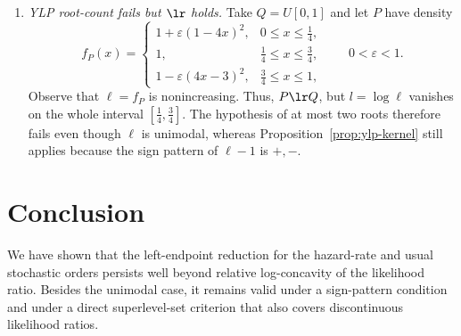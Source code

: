 \documentclass[11pt]{article}
\begin{document}
\begin{example}
\begin{enumerate}[label=\textup{(\Alph*)}]
\item \emph{YLP root-count fails but \(\lr\) holds.}
Take \(Q=U[0,1]\) and let \(P\) have density
\[
f_P(x)=
\begin{cases}
1+\varepsilon(1-4x)^2, & 0\le x\le \tfrac14,\\[1mm]
1, & \tfrac14\le x\le \tfrac34,\\[1mm]
1-\varepsilon(4x-3)^2, & \tfrac34\le x\le 1,
\end{cases}
\qquad 0<\varepsilon<1.
\]
Observe that \(\ell=f_P\) is nonincreasing. Thus, \(P\lr Q\), but \(l=\log\ell\) vanishes on the whole interval \([\tfrac14,\tfrac34]\). The hypothesis of  at most two roots therefore fails even though $\ell$ is unimodal, whereas Proposition~\ref{prop:ylp-kernel} still applies because the sign pattern of \(\ell-1\) is \(+,-\).
\end{enumerate}
\end{example}


\section{Conclusion}
\label{sec:discussion}

We have shown that the left-endpoint reduction for the hazard-rate and usual stochastic orders persists well beyond relative log-concavity of the likelihood ratio. Besides the unimodal case, it remains valid under a sign-pattern condition and under a direct superlevel-set criterion that also covers discontinuous likelihood ratios.

\printbibliography
\end{document}
